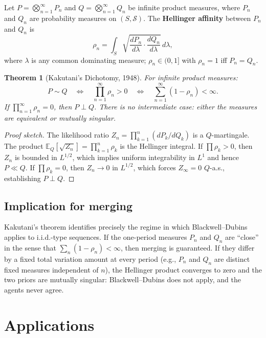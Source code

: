 \documentclass[12pt]{article}
\newtheorem{theorem}{Theorem}[section]
\newcommand{\E}{\mathbb{E}}
\begin{document}
Let $P = \bigotimes_{n=1}^\infty P_n$ and $Q = \bigotimes_{n=1}^\infty Q_n$
be infinite product measures, where $P_n$ and $Q_n$ are probability measures
on $(S, \mathscr{S})$.  The \textbf{Hellinger affinity} between $P_n$ and
$Q_n$ is
\[
\rho_n = \int_S \sqrt{\frac{dP_n}{d\lambda}\cdot\frac{dQ_n}{d\lambda}}\, d\lambda,
\]
where $\lambda$ is any common dominating measure; $\rho_n \in (0, 1]$ with
$\rho_n = 1$ iff $P_n = Q_n$.

\begin{theorem}[Kakutani's Dichotomy, 1948]
\label{thm:kakutani}
For infinite product measures:
\[
P \sim Q \quad \iff \quad \prod_{n=1}^\infty \rho_n > 0
\quad \iff \quad \sum_{n=1}^\infty (1 - \rho_n) < \infty.
\]
If $\prod_{n=1}^\infty \rho_n = 0$, then $P \perp Q$.  There is no
intermediate case: either the measures are equivalent or mutually singular.
\end{theorem}

\begin{proof}[Proof sketch]
The likelihood ratio $Z_n = \prod_{k=1}^n (dP_k/dQ_k)$ is a $Q$-martingale.
The product $\E_Q[\sqrt{Z_n}] = \prod_{k=1}^n \rho_k$ is the Hellinger
integral.  If $\prod \rho_k > 0$, then $Z_n$ is bounded in $L^{1/2}$, which
implies uniform integrability in $L^1$ and hence $P \ll Q$.  If
$\prod \rho_k = 0$, then $Z_n \to 0$ in $L^{1/2}$, which forces
$Z_\infty = 0$ $Q$-a.s., establishing $P \perp Q$.
\end{proof}

\subsection{Implication for merging}

Kakutani's theorem identifies precisely the regime in which Blackwell--Dubins
applies to i.i.d.-type sequences.  If the one-period measures $P_n$ and $Q_n$
are ``close'' in the sense that $\sum_n (1 - \rho_n) < \infty$, then merging
is guaranteed.  If they differ by a fixed total variation amount at every
period (e.g., $P_n$ and $Q_n$ are distinct fixed measures independent of $n$),
the Hellinger product converges to zero and the two priors are mutually
singular: Blackwell--Dubins does not apply, and the agents never agree.

\section{Applications}
\label{sec:applications}
\end{document}
